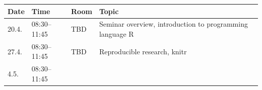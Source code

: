 \documentclass[]{article}
\begin{document}
\begin{longtable}[c]{@{}llll@{}}
\toprule
\begin{minipage}[b]{0.11\columnwidth}\raggedright\strut
Date
\strut\end{minipage} &
\begin{minipage}[b]{0.15\columnwidth}\raggedright\strut
Time
\strut\end{minipage} &
\begin{minipage}[b]{0.13\columnwidth}\raggedright\strut
Room
\strut\end{minipage} &
\begin{minipage}[b]{0.50\columnwidth}\raggedright\strut
Topic
\strut\end{minipage}\tabularnewline
\midrule
\endhead
\begin{minipage}[t]{0.11\columnwidth}\raggedright\strut
20.4.
\strut\end{minipage} &
\begin{minipage}[t]{0.15\columnwidth}\raggedright\strut
08:30--11:45
\strut\end{minipage} &
\begin{minipage}[t]{0.13\columnwidth}\raggedright\strut
TBD
\strut\end{minipage} &
\begin{minipage}[t]{0.50\columnwidth}\raggedright\strut
Seminar overview, introduction to programming language R
\strut\end{minipage}\tabularnewline
\begin{minipage}[t]{0.11\columnwidth}\raggedright\strut
27.4.
\strut\end{minipage} &
\begin{minipage}[t]{0.15\columnwidth}\raggedright\strut
08:30--11:45
\strut\end{minipage} &
\begin{minipage}[t]{0.13\columnwidth}\raggedright\strut
TBD
\strut\end{minipage} &
\begin{minipage}[t]{0.50\columnwidth}\raggedright\strut
Reproducible research, knitr
\strut\end{minipage}\tabularnewline
\begin{minipage}[t]{0.11\columnwidth}\raggedright\strut
4.5.
\strut\end{minipage} &
\begin{minipage}[t]{0.15\columnwidth}\raggedright\strut
08:30--11:45
\strut\end{minipage} &
\begin{minipage}[t]{0.13\columnwidth}\raggedright\strut

\end{minipage}
\end{longtable}
\end{document}
